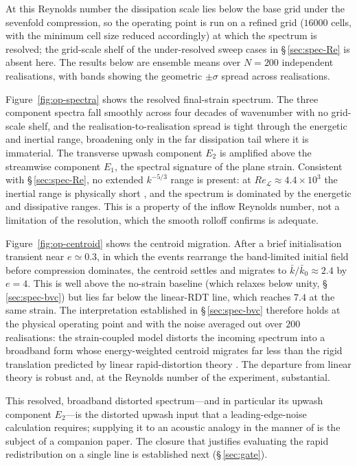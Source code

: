 \documentclass[lineno]{JFM-FLM_Au}
\begin{document}
At this Reynolds number the dissipation scale lies below the base grid under
the sevenfold compression, so the operating point is run on a refined grid
($16000$ cells, with the minimum cell size reduced accordingly) at which the
spectrum is resolved; the grid-scale shelf of the under-resolved sweep cases in
\S\,\ref{sec:spec-Re} is absent here. The results below are ensemble means over
$N=200$ independent realisations, with bands showing the geometric $\pm\sigma$
spread across realisations.

Figure~\ref{fig:op-spectra} shows the resolved final-strain spectrum. The three
component spectra fall smoothly across four decades of wavenumber with no
grid-scale shelf, and the realisation-to-realisation spread is tight through the
energetic and inertial range, broadening only in the far dissipation tail where
it is immaterial. The transverse upwash component $E_2$ is amplified above the
streamwise component $E_1$, the spectral signature of the plane strain.
Consistent with \S\,\ref{sec:spec-Re}, no extended $k^{-5/3}$ range is present:
at $Re_{\mathcal{L}}\approx4.4\times10^3$ the inertial range is physically short
\citep{Pope2000}, and the spectrum is dominated by the energetic and dissipative
ranges. This is a property of the inflow Reynolds number, not a limitation of
the resolution, which the smooth rolloff confirms is adequate.

Figure~\ref{fig:op-centroid} shows the centroid migration. After a brief
initialisation transient near $e\simeq0.3$, in which the events rearrange the
band-limited initial field before compression dominates, the centroid settles
and migrates to $\bar k/\bar k_0\approx2.4$ by $e=4$. This is well above the
no-strain baseline (which relaxes below unity, \S\,\ref{sec:spec-bvc}) but lies
far below the linear-RDT line, which reaches $7.4$ at the same strain. The
interpretation established in \S\,\ref{sec:spec-bvc} therefore holds at the
physical operating point and with the noise averaged out over $200$
realisations: the strain-coupled model distorts the incoming spectrum into a
broadband form whose energy-weighted centroid migrates far less than the rigid
translation predicted by linear rapid-distortion theory
\citep{BatchelorProudman1954,HuntCarruthers1990}. The departure from linear
theory is robust and, at the Reynolds number of the experiment, substantial.

This resolved, broadband distorted spectrum---and in particular its upwash component $E_2$---is the distorted upwash input that a leading-edge-noise calculation requires; supplying it to an acoustic analogy in the manner of \citet{Amiet1975} is the subject of a companion paper. The closure that justifies evaluating the rapid redistribution on a single line is established next (\S\,\ref{sec:gate}).
\end{document}
